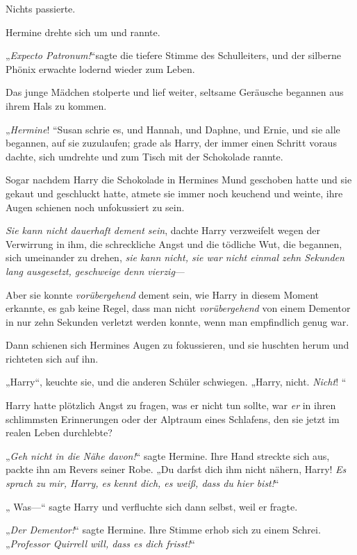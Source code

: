 {Nichts passierte.

Hermine drehte sich um und rannte.

„\emph{Expecto Patronum!}“sagte die tiefere Stimme des Schulleiters, und der silberne Phönix erwachte lodernd wieder zum Leben.

Das junge Mädchen stolperte und lief weiter, seltsame Geräusche begannen aus ihrem Hals zu kommen.

„\emph{Hermine}! “Susan schrie es, und Hannah, und Daphne, und Ernie, und sie alle begannen, auf sie zuzulaufen; grade als Harry, der immer einen Schritt voraus dachte, sich umdrehte und zum Tisch mit der Schokolade rannte.

Sogar nachdem Harry die Schokolade in Hermines Mund geschoben hatte und sie gekaut und geschluckt hatte, atmete sie immer noch keuchend und weinte, ihre Augen schienen noch unfokussiert zu sein.

\emph{Sie kann nicht dauerhaft dement sein}, dachte Harry verzweifelt wegen der Verwirrung in ihm, die schreckliche Angst und die tödliche Wut, die begannen, sich umeinander zu drehen, \emph{sie kann nicht, sie war nicht einmal zehn Sekunden lang ausgesetzt, geschweige denn vierzig}—

Aber sie konnte \emph{vorübergehend} dement sein, wie Harry in diesem Moment erkannte, es gab keine Regel, dass man nicht \emph{vorübergehend} von einem Dementor in nur zehn Sekunden verletzt werden konnte, wenn man empfindlich genug war.

Dann schienen sich Hermines Augen zu fokussieren, und sie huschten herum und richteten sich auf ihn.

„Harry“, keuchte sie, und die anderen Schüler schwiegen. „Harry, nicht. \emph{Nicht}! “

Harry hatte plötzlich Angst zu fragen, was er nicht tun sollte, war \emph{er} in ihren schlimmsten Erinnerungen oder der Alptraum eines Schlafens, den sie jetzt im realen Leben durchlebte?

„\emph{Geh nicht in die Nähe davon!}“ sagte Hermine. Ihre Hand streckte sich aus, packte ihn am Revers seiner Robe. „Du darfst dich ihm nicht nähern, Harry! \emph{Es sprach zu mir, Harry, es kennt dich, es weiß, dass du hier bist!}“

„ Was—“ sagte Harry und verfluchte sich dann selbst, weil er fragte.

„\emph{Der Dementor!}“ sagte Hermine. Ihre Stimme erhob sich zu einem Schrei. „\emph{Professor Quirrell will, dass es dich frisst!}“

}
